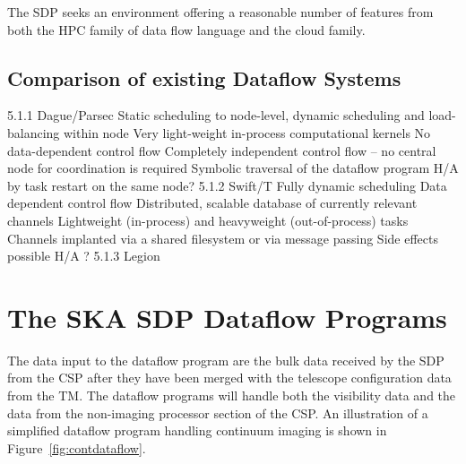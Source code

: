 \documentclass[11pt,a4paper]{article}
\begin{document}
The SDP seeks an environment offering a reasonable number of features
from both the HPC family of data flow language and the cloud family.

\subsection{Comparison of  existing Dataflow Systems}
5.1.1 Dague/Parsec
Static scheduling to node-level, dynamic scheduling and load-balancing within node
Very light-weight in-process computational kernels
No data-dependent control flow
Completely independent control flow – no central node for coordination is required
Symbolic traversal of the dataflow program
H/A by task restart on the same node?
5.1.2 Swift/T
Fully dynamic scheduling
Data dependent control flow
Distributed, scalable database of currently relevant channels
Lightweight (in-process) and heavyweight (out-of-process) tasks
Channels implanted via a shared filesystem or via message passing
Side effects possible
H/A ?
5.1.3 Legion





\section{The SKA SDP Dataflow Programs}
\label{sec:ska-sdp-dataflow}

The data input to the dataflow program are the bulk data received by
the SDP from the CSP after they have been merged with the telescope
configuration data from the TM. The dataflow programs will handle both
the visibility data and the data from the non-imaging processor
section of the CSP. An illustration of a simplified dataflow program
handling continuum imaging is shown in Figure~\ref{fig:contdataflow}.
\end{document}
